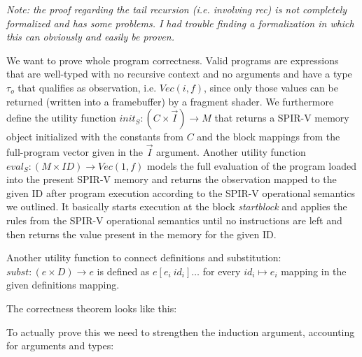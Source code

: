 \documentclass[letterpaper,12pt]{article}
\newcommand{\vi}{\vec{I}}
\begin{document}
\textit{Note: the proof regarding the tail recursion (i.e. involving \textit{rec})
is not completely formalized and has some problems. I had trouble finding a formalization
in which this can obviously and easily be proven.}
\medskip

We want to prove whole program correctness. Valid programs are expressions
that are well-typed with no recursive context and no arguments and
have a type $\tau_o$ that qualifies as observation, i.e. $Vec(i, f)$, since only
those values can be returned (written into a framebuffer) by a fragment shader.
We furthermore define the utility function
$init_S: (C \times \vi) \rightarrow M $ that returns
a SPIR-V memory object initialized with the constants from $C$ and the 
block mappings from the full-program vector given in the $\vi$ argument.
Another utility function $eval_S: (M \times ID) \rightarrow Vec(1, f)$
models the full evaluation of the program loaded into the present SPIR-V
memory and returns the observation mapped to the given ID after
program execution according to the SPIR-V operational semantics we
outlined. It basically starts execution at the block \textit{startblock}
and applies the rules from the SPIR-V operational semantics until
no instructions are left and then returns the value present in the
memory for the given ID.

Another utility function to connect definitions and substitution:
$subst: (e \times D) \rightarrow e$ is defined as
$e[e_i \ id_i]\dots$ for every $id_i \mapsto e_i$ mapping in the
given definitions mapping.

The correctness theorem looks like this:

\begin{center}
\end{center}
\medskip
To actually prove this we need to strengthen the induction argument,
accounting for arguments and types:
\end{document}
